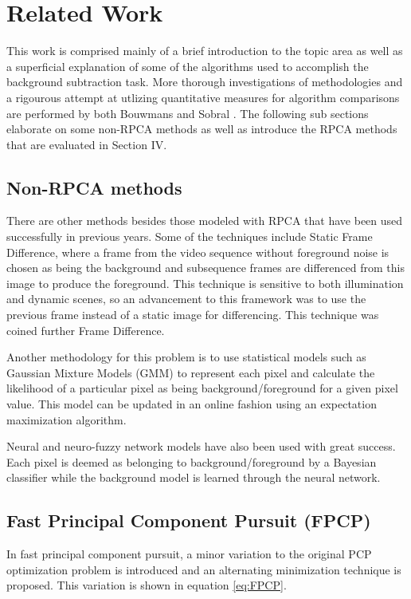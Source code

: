 \documentclass[conference]{IEEEtran}
\begin{document}
\section{Related Work}
This work is comprised mainly of a brief introduction to the topic area as well as a superficial explanation of  some of the algorithms used to accomplish the background subtraction task. More thorough investigations of methodologies and a rigourous attempt at utlizing quantitative measures for algorithm comparisons are performed by both Bouwmans \cite{RPCAreview} and Sobral \cite{Sobral}. The following sub sections elaborate on some non-RPCA methods as well as introduce the RPCA methods that are evaluated in Section IV.

\subsection{Non-RPCA methods}
There are other methods besides those modeled with RPCA that have been used successfully in previous years. Some of the techniques include Static Frame Difference, where a frame from the video sequence without foreground noise is chosen as being the background and subsequence frames are differenced from this image to produce the foreground. This technique is sensitive to both illumination and dynamic scenes, so an advancement to this framework was to use the previous frame instead of a static image for differencing. This technique was coined further Frame Difference. 

Another methodology for this problem is to use statistical models such as Gaussian Mixture Models (GMM) to represent each pixel and calculate the likelihood of a particular pixel as being background/foreground for a given pixel value. This model can be updated in an online fashion using an expectation maximization algorithm. 

Neural and neuro-fuzzy network models have also been used with great success. Each pixel is deemed as belonging to background/foreground by a Bayesian classifier while the background model is learned through the neural network.

\subsection{Fast Principal Component Pursuit (FPCP) \cite{FPCP}}
In fast principal component pursuit, a minor variation to the original PCP optimization problem is introduced and an alternating minimization technique is proposed. This variation is shown in equation \ref{eq:FPCP}.
\end{document}
